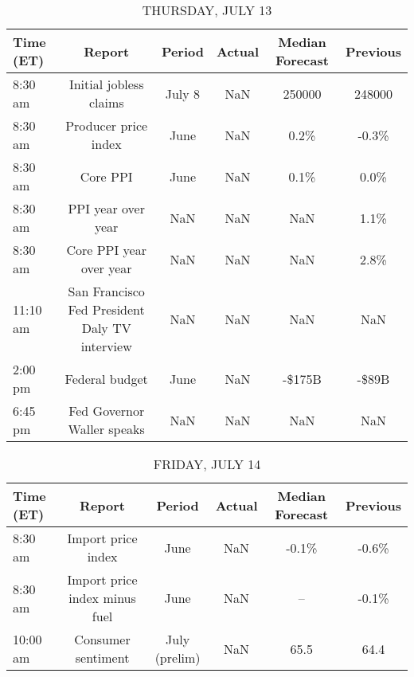 \documentclass{article}%
\begin{document}
\begin{table}[htbp]%
\caption{THURSDAY, JULY 13}%
\centering%
\begin{adjustbox}{width=1\textwidth}%
\begin{tabular}{lccccc}
\toprule
Time (ET) &                                        Report & Period & Actual & Median Forecast & Previous \\
\midrule
  8:30 am &                        Initial jobless claims & July 8 &    NaN &          250000 &   248000 \\
  8:30 am &                          Producer price index &   June &    NaN &            0.2\% &    -0.3\% \\
  8:30 am &                                      Core PPI &   June &    NaN &            0.1\% &     0.0\% \\
  8:30 am &                            PPI year over year &    NaN &    NaN &             NaN &     1.1\% \\
  8:30 am &                       Core PPI year over year &    NaN &    NaN &             NaN &     2.8\% \\
 11:10 am & San Francisco Fed President Daly TV interview &    NaN &    NaN &             NaN &      NaN \\
  2:00 pm &                                Federal budget &   June &    NaN &          -\$175B &    -\$89B \\
  6:45 pm &                    Fed Governor Waller speaks &    NaN &    NaN &             NaN &      NaN \\
\bottomrule
\end{tabular}
%
\end{adjustbox}%
\end{table}

%


\begin{table}[htbp]%
\caption{FRIDAY, JULY 14}%
\centering%
\begin{adjustbox}{width=1\textwidth}%
\begin{tabular}{lccccc}
\toprule
Time (ET) &                        Report &        Period & Actual & Median Forecast & Previous \\
\midrule
  8:30 am &            Import price index &          June &    NaN &           -0.1\% &    -0.6\% \\
  8:30 am & Import price index minus fuel &          June &    NaN &              -- &    -0.1\% \\
 10:00 am &            Consumer sentiment & July (prelim) &    NaN &            65.5 &     64.4 \\
\bottomrule
\end{tabular}
%
\end{adjustbox}%
\end{table}
\end{document}
